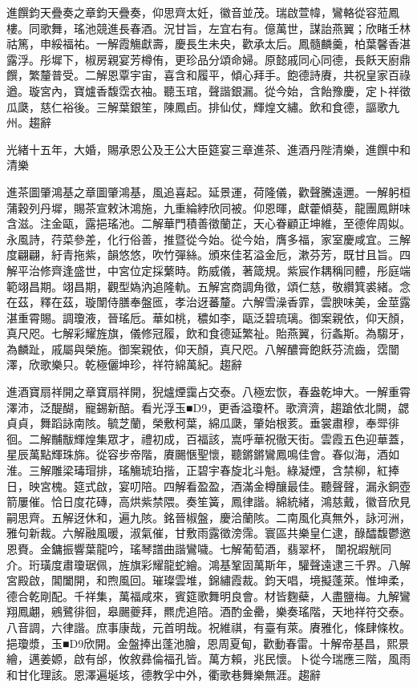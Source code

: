 \begin{pinyinscope}
進饌鈞天疊奏之章鈞天疊奏，仰思齊太妊，徽音並茂。瑞啟萱幃，鸞輅從容蒞鳳樓。同歌舞，瑤池競進長春酒。況甘旨，左宜右有。億萬世，謀詒燕翼；欣睹壬林祜篤，申綏福祐。一解霞觴獻壽，慶長生未央，歡承太后。鳳髓麟羹，柏葉馨香湛露浮。彤墀下，椒房親宴芳樽侑，更珍品分頌命婦。原懿戚同心同德，長飫天廚鼎饌，繁釐普受。二解恩覃宇宙，喜含和履平，傾心拜手。飽德詩賡，共祝皇家百祿遒。璇宮內，寶爐香馥霑衣袖。聽玉琯，聲諧銀漏。從今始，含飴豫慶，定卜祥徵瓜瓞，慈仁裕後。三解葉銀笙，陳鳳卣。排仙仗，輝煌文繡。飲和食德，謳歌九州。趨辭

光緒十五年，大婚，賜承恩公及王公大臣筵宴三章進茶、進酒丹陛清樂，進饌中和清樂

進茶圖肇鴻基之章圖肇鴻基，風追喜起。延景運，荷隆儀，歡聲騰遠邇。一解躬桓蒲穀列丹墀，賜茶宣敕沐鴻施，九重綸綍欣同被。仰恩暉，獻藿傾葵，龍團鳳餅味含滋。注金甌，露挹瑤池。二解華門積善徵蘭芷，天心眷顧正坤維，至德侔周姒。永風詩，荇菜參差，化行俗善，推暨從今始。從今始，膺多福，家室慶咸宜。三解度翩翩，紆青拖紫，韻悠悠，吹竹彈絲。頒來佳茗溢金卮，漱芬芳，既甘且旨。四解平治修齊逢盛世，中宮位定採蘩時。飭威儀，著箴規。紫宸作耦稱同體，彤庭端範翊昌期。翊昌期，觀型媯汭追隆軌。五解宮商調角徵，頌仁慈，敬纘箕裘緒。念在茲，釋在茲，璇闈侍膳奉盤匜，孝治迓蕃釐。六解雪澡香霏，雲腴味美，金莖露湛重霄賜。調瓊液，晉瑤卮。華如桃，穠如李，甌泛碧琉璃。御案親依，仰天顏，真尺咫。七解彩耀旌旗，儀修冠履，飲和食德延繁祉。貽燕翼，衍螽斯。為騶牙，為麟趾，戚屬與榮施。御案親依，仰天顏，真尺咫。八解醲膏飽飫芬流齒，霑闓澤，欣歌樂只。乾極儷坤珍，祥符綿萬紀。趨辭

進酒寶扇祥開之章寶扇祥開，猊爐煙靄占交泰。八極宏恢，春盎乾坤大。一解重霄澤沛，泛醍醐，寵錫新醅。看光浮玉■D9，更香溢瓊杯。歌濟濟，趨蹌依北闕，勰貞貞，舞蹈詠南陔。毓芝蘭，榮敷柯葉，綿瓜瓞，肇始根荄。垂裳肅穆，奉斝徘徊。二解黼黻輝煌集眾才，禮初成，百福該，嵩呼華祝徹天街。雲霞五色迎華蓋，星辰萬點輝珠旆。從容步帝階，賡颺愜聖懷，聽鏘鏘鸞鳳鳴佳會。春似海，酒如淮。三解雕梁瑇瑁排，瑤觴琥珀揩，正碧宇春旋北斗魁。綠凝煙，含禁柳，紅捧日，映宮槐。筵式啟，宴叨陪。四解看盈盈，酒滿金樽釀最佳。聽聲聲，漏永銅壺箭屢催。恰日度花磚，高烘紫禁隈。奏笙簧，鳳律諧。綿統緒，鴻慈戴，徽音欣見嗣思齊。五解迓休和，遍九陔。銘晉椒盤，慶洽蘭陔。二南風化真無外，詠河洲，雅句新裁。六解融風暖，淑氣催，甘敷雨露徵滂霈。寰區共樂皇仁逮，醁醽馥鬱邀恩賚。金鏞振響葉龍吟，瑤琴譜曲諧鸞噦。七解葡萄酒，翡翠杯，闈祝嘏觥同介。珩璜度肅瓊琚佩，旌旗彩耀龍蛇繪。鴻基鞏固萬斯年，驩聲遠逮三千界。八解宮殿啟，閶闔開，和煦風回。璀璨雲堆，錦繡霞裁。鈞天唱，境擬蓬萊。惟坤柔，德合乾剛配。千祥集，萬福咸來，賓筵歌舞明良會。材皆麴蘗，人盡鹽梅。九解鸞翔鳳翽，鵷鷺徘徊，皋颺夔拜，羆虎追陪。酒酌金罍，樂奏瑤階，天地祥符交泰。八音調，六律諧。庶事康哉，元首明哉。祝維祺，有臺有萊。賡雅化，條肆條枚。挹瓊漿，玉■D9欣開。金盤捧出蓬池膾，恩周夏甸，歡動春雷。十解帝基昌，熙景繪，邁姜嫄，啟有邰，攸敘彞倫福孔皆。萬方賴，兆民懷。卜從今瑞應三階，風雨和甘化理該。恩澤遍埏垓，德教孚中外，衢歌巷舞樂無涯。趨辭


\end{pinyinscope}
